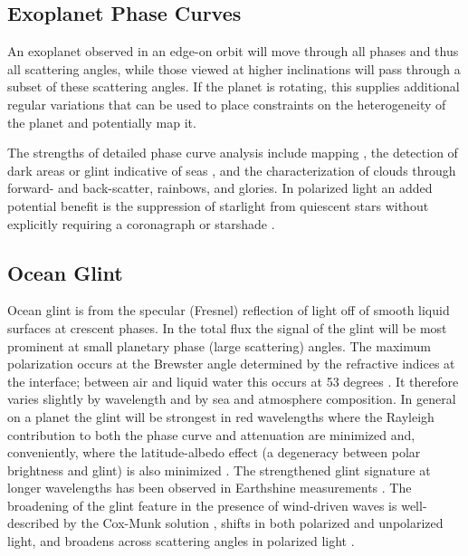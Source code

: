 \documentclass[
    usenatbib,
]{mnras}
\begin{document}
\subsection{Exoplanet Phase Curves}

An exoplanet observed in an edge-on orbit will move through all phases and thus all scattering angles, while those viewed at higher inclinations will pass through a subset of these scattering angles.
%
If the planet is rotating, this supplies additional regular variations that can be used to place constraints on the heterogeneity of the planet and potentially map it.

The strengths of detailed phase curve analysis include mapping \citep{2001Natur.412..885F, berdyugina2019surface}, the detection of dark areas or glint indicative of seas \citep{groot2020, cowan2008inverting, lustig2019}, and the characterization of clouds through forward- and back-scatter, rainbows, and glories.
%
In polarized light an added potential benefit is the suppression of starlight from quiescent stars without explicitly requiring a coronagraph or starshade \citep{kemp1987}.


\subsection{Ocean Glint}

Ocean glint is from the specular (Fresnel) reflection of light off of smooth liquid surfaces at crescent phases.
%
In the total flux the signal of the glint will be most prominent at small planetary phase (large scattering) angles.
%
The maximum polarization occurs at the Brewster angle determined by the refractive indices at the interface; between air and liquid water this occurs at 53 degrees  \citep[a scattering angle of 127 degrees; see e.g. ][]{2008Icar..195..927W}.
%
It therefore varies slightly by wavelength and by sea and atmosphere composition.
%
In general on a planet the glint will be strongest in red wavelengths where the Rayleigh contribution to both the phase curve and attenuation are minimized \citep{Zugger_2011} and, conveniently, where the latitude-albedo effect (a degeneracy between polar brightness and glint) is also minimized \citep{2012ApJ...752L...3C}.
%
The strengthened glint signature at longer wavelengths has been observed in Earthshine measurements \citep{Emde2017,sterzik2019, takahashi2021}.
%
The broadening of the glint feature in the presence of wind-driven waves is well-described by the Cox-Munk solution \citep{CoxMunk1954}, shifts in both polarized and unpolarized light, and broadens across scattering angles in polarized light \citep{kopparla2018, Zugger_2010, treesandstam2019, trees2022}. 
\end{document}
